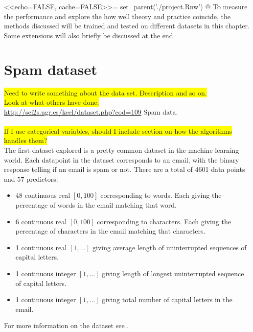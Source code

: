 <<echo=FALSE, cache=FALSE>>=
set_parent('./project.Rnw')
@
%
To measure the performance and explore the how well theory and practice coincide, the methods discussed will be trained and tested on different datasets in this chapter. Some extensions will also briefly be discussed at the end.

\section{Spam dataset}
\label{sec:Spam dataset}
\colorbox{yellow}{Need to write something about the data set. Description and so on.}\\
\colorbox{yellow}{Look at what others have done.} \\
\url{http://sci2s.ugr.es/keel/dataset.php?cod=109} Spam data.\\
\\
\colorbox{yellow}{If I use categorical variables, should I include section on how the algorithms handles them?}\\
 The first dataset explored is a pretty common dataset in the machine learning world. 
 Each datapoint in the dataset corresponds to an email, with the binary response telling if an email is spam or not. There are a total of 4601 data points and 57 predictors:
 \begin{itemize}
   \item 48 continuous real $[0, 100]$ corresponding to words. Each giving the percentage of words in the email matching that word. 
   \item 6 continuous real $[0, 100]$ corresponding to characters. Each giving the percentage of characters in the email matching that characters.
   \item 1 continuous real $[1, \ldots]$ giving average length of uninterrupted sequences of capital letters. 
   \item 1 continuous integer $[1, \ldots]$ giving length of longest uninterrupted sequence of capital letters.
   \item 1 continuous integer $[1, \ldots]$ giving total number of capital letters in the email.
 \end{itemize}
 For more information on the dataset see \cite{Spamdata}.

